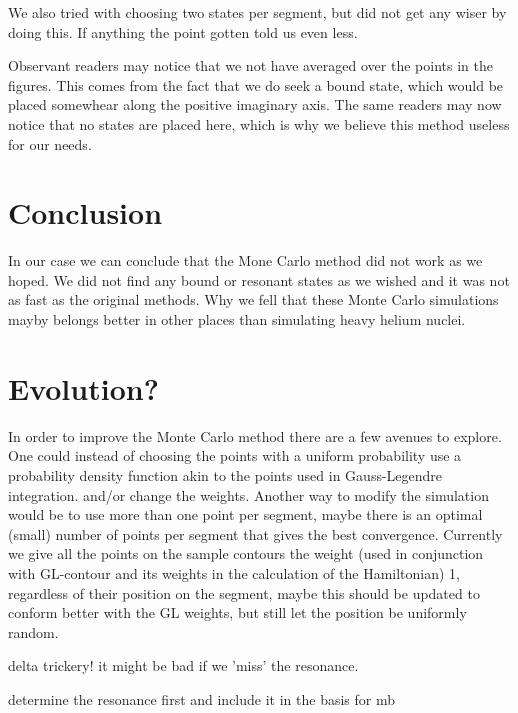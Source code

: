 We also tried with choosing two states per segment, but did not get any wiser by doing this.
If anything the point gotten told us even less.

Observant readers may notice that we not have averaged over the points in the figures.
This comes from the fact that we do seek a bound state, which would be placed somewhear along the positive imaginary axis.
The same readers may now notice that no states are placed here, which is why we believe this method useless for our needs.

\section{Conclusion}
In our case we can conclude that the Mone Carlo method did not work as we hoped.
We did not find any bound or resonant states as we wished and it was not as fast as the original methods.
Why we fell that these Monte Carlo simulations mayby belongs better in other places than simulating heavy helium nuclei.

\section{Evolution?}
In order to improve the Monte Carlo method there are a few avenues to explore.
One could instead of choosing the points with a uniform probability use a probability density function akin to the points used in Gauss-Legendre integration. 
and/or change the weights.
Another way to modify the simulation would be to use more than one point per segment, maybe there is an optimal (small) number of points per segment that gives the best convergence. 
Currently we give all the points on the sample contours the weight (used in conjunction with GL-contour and its weights in the calculation of the Hamiltonian) 1, regardless of their position on the segment, maybe this should be updated to conform better with the GL weights, but still let the position be uniformly random.

delta trickery! it might be bad if we 'miss' the resonance.

determine the resonance first and include it in the basis for mb